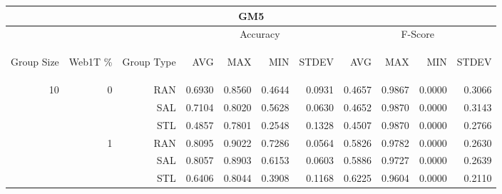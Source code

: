 \begin{center}
\begin{table}[htbp] 
 \begin{center}
\begin{tabular}{ | r | r | r | r | r | r | r | r | r | r | r |}
\hline
\multicolumn{11}{|c|}{GM5}\\
\hline
 & & & \multicolumn{4}{|c|}{Accuracy} & \multicolumn{4}{|c|}{F-Score}\\ \cline{4-11}
\begin{sideways}Group Size\end{sideways} & \begin{sideways}Web1T \%\end{sideways} & \begin{sideways}Group Type\end{sideways} & \begin{sideways}AVG\end{sideways} & \begin{sideways}MAX\end{sideways} & \begin{sideways}MIN\end{sideways} & \begin{sideways}STDEV\end{sideways} & \begin{sideways}AVG\end{sideways} & \begin{sideways}MAX\end{sideways} & \begin{sideways}MIN\end{sideways} & \begin{sideways}STDEV\end{sideways}\\
\hline
\multirow{18}{*}{10}
 & \multirow{3}{*}{0} & RAN & 0.6930 & 0.8560 & 0.4644 & 0.0931 & 0.4657 & 0.9867 & 0.0000 & 0.3066\\ \cline{3-11}
 &   & SAL & 0.7104 & 0.8020 & 0.5628 & 0.0630 & 0.4652 & 0.9870 & 0.0000 & 0.3143\\ \cline{3-11}
 &   & STL & 0.4857 & 0.7801 & 0.2548 & 0.1328 & 0.4507 & 0.9870 & 0.0000 & 0.2766\\ \cline{2-11}
 & \multirow{3}{*}{1} & RAN & 0.8095 & 0.9022 & 0.7286 & 0.0564 & 0.5826 & 0.9782 & 0.0000 & 0.2630\\ \cline{3-11}
 &   & SAL & 0.8057 & 0.8903 & 0.6153 & 0.0603 & 0.5886 & 0.9727 & 0.0000 & 0.2639\\ \cline{3-11}
 &   & STL & 0.6406 & 0.8044 & 0.3908 & 0.1168 & 0.6225 & 0.9604 & 0.0000 & 0.2110\\ \cline{2-11}

\end{tabular}
\end{center}
\end{table}
\end{center}
